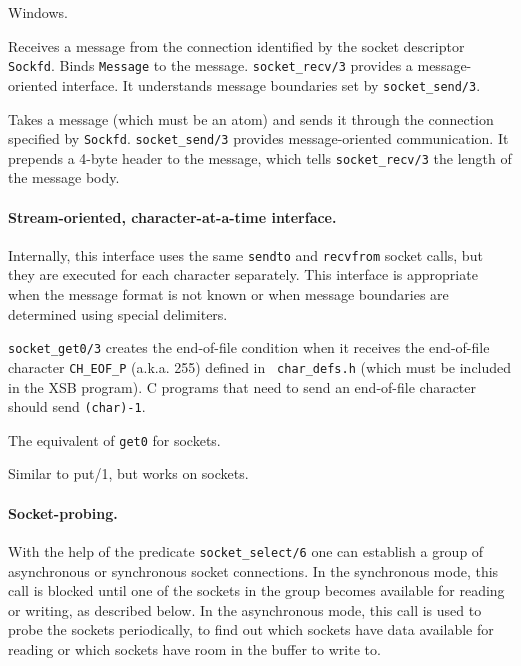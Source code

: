Windows.
\begin{description}
    Receives a message from the connection identified by the socket descriptor
    {\tt Sockfd}. Binds {\tt Message} to the message. {\tt socket\_recv/3}
    provides a message-oriented interface. It understands message
    boundaries set by {\tt socket\_send/3}.

    Takes a message (which must be an atom) and sends it through the
    connection specified by {\tt Sockfd}. {\tt socket\_send/3} provides
    message-oriented communication. It prepends a 4-byte header to the
    message, which tells {\tt socket\_recv/3} the length of the message body.

\end{description}

\paragraph{Stream-oriented, character-at-a-time interface.}
Internally, this interface uses the same {\tt sendto} and {\tt recvfrom}
socket calls, but they are executed for each character separately.
This interface is appropriate when the message format is not known or when
message boundaries are determined using special delimiters.

{\tt socket\_get0/3} creates the end-of-file condition when it receives the
end-of-file character {\tt CH\_EOF\_P} (a.k.a. 255) defined in {\tt
  char\_defs.h} (which must be included in the XSB program). C programs
that need to send an end-of-file character should send {\tt (char)-1}.
\begin{description}
The equivalent of {\tt get0} for sockets.

Similar to put/1, but works on sockets.
\end{description}

\paragraph{Socket-probing.}
With the help of the predicate {\tt socket\_select/6} one can establish a
group of asynchronous or synchronous socket connections. In the synchronous
mode, this call is blocked until one of the sockets in the group becomes
available for reading or writing, as described below.  In the asynchronous
mode, this call is used to probe the sockets periodically, to find out
which sockets have data available for reading or which sockets have room in
the buffer to write to.

